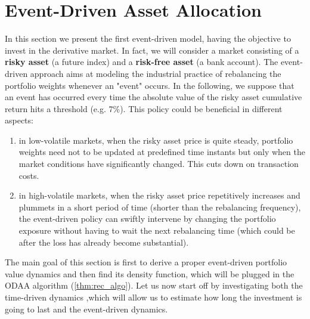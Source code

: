 \section{Event-Driven Asset Allocation}\label{sec:EventDrivenAA}
In this section we present the first event-driven model, having the objective to invest in the derivative market. In fact, we will consider a market consisting of a \textbf{risky asset} (a future index) and a \textbf{risk-free asset} (a bank account). The event-driven approach aims at modeling the industrial practice of rebalancing the portfolio weights whenever an "event" occurs. In the following, we suppose that an event has occurred every time the absolute value of the risky asset cumulative return hits a threshold (e.g. 7\%). This policy could be beneficial in different aspects:
\begin{enumerate}
	\item in low-volatile markets, when the risky asset price is quite steady, portfolio weights need not to be updated at predefined time instants but only when the market conditions have significantly changed. This cuts down on transaction costs.
	\item in high-volatile markets, when the risky asset price repetitively increases and plummets in a short period of time (shorter than the rebalancing frequency), the event-driven policy can swiftly intervene by changing the portfolio exposure without having to wait the next rebalancing time (which could be after the loss has already become substantial).
\end{enumerate}
The main goal of this section is first to derive a proper event-driven portfolio value dynamics and then find its density function, which will be plugged in the \gls{ODAA} algorithm (\ref{thm:rec_algo}).
Let us now start off by investigating both the time-driven dynamics ,which will allow us to estimate how long the investment is going to last and the event-driven dynamics.
